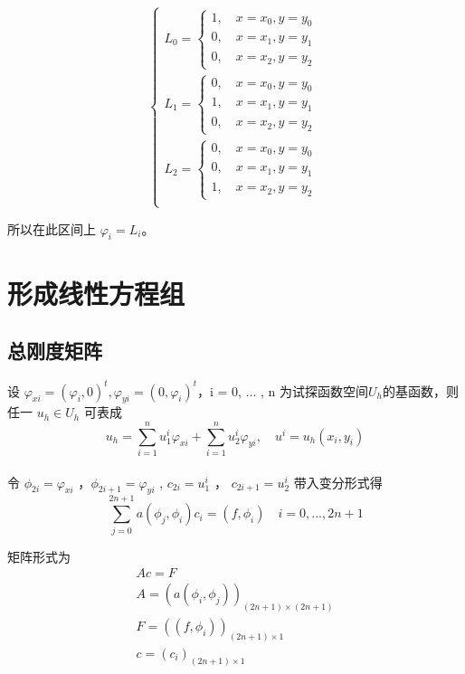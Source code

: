 \documentclass[UTF8,titlepage,twocolumn]{ctexart}
\begin{document}
$$
\begin{cases}
	L_0 = \begin{cases}
			 1, \quad x = x_0, y = y_0 \\
			 0, \quad x = x_1, y = y_1 \\
			 0, \quad x = x_2, y = y_2
		  \end{cases} \\
	L_1 = \begin{cases}
			 0, \quad x = x_0, y = y_0 \\
			 1, \quad x = x_1, y = y_1 \\
			 0, \quad x = x_2, y = y_2
		  \end{cases} \\
	L_2 = \begin{cases}
			 0, \quad x = x_0, y = y_0 \\
			 0, \quad x = x_1, y = y_1 \\
			 1, \quad x = x_2, y = y_2
		  \end{cases} \\
\end{cases}
$$

所以在此区间上 $\varphi_i = L_i$。

\section{形成线性方程组}

\subsection{总刚度矩阵}

设 $\varphi_{xi} = (\varphi_i, 0)^t, \varphi_{yi} = (0,\varphi_i)^t$，i = 0, ... , n 为试探函数空间$U_h$的基函数，则任一 $u_h \in U_h$ 可表成
$$
	u_h = \sum\limits_{i=1}^n u^{i}_1 \varphi_{xi} + \sum\limits_{i=1}^n u^{i}_2 \varphi_{yi}, \quad u^i = u_h(x_i,y_i)
$$ 
\\ 
令 $\phi_{2i} = \varphi_{xi}$ ，$\phi_{2i+1} = \varphi_{yi}$ , $c_{2i} = u^i_1$ ， $c_{2i+1} = u^i_2$
带入变分形式得
$$
	\sum\limits_{j=0}^{2n+1} a(\phi_j, \phi_i) c_i = (f,\phi_i) \quad i=0, ... ,2n+1
$$

矩阵形式为
$$
\begin{matrix}
	A c = F \\
	A = (a(\phi_i, \phi_j))_{(2n+1) \times (2n+1)} \\
	F = ((f,\phi_i))_{(2n+1) \times 1} \\
	c = (c_i)_{(2n+1) \times 1}
\end{matrix}
$$
\end{document}
